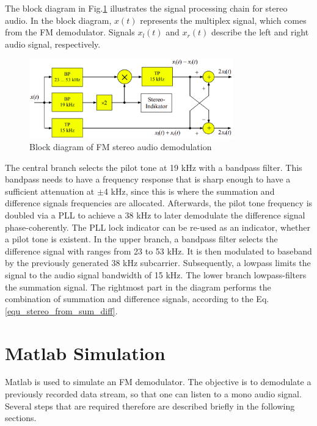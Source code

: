 \documentclass[conference]{IEEEtran}
\begin{document}
    The block diagram in Fig.\ref{fig_bd_stereo_demod} illustrates the signal processing chain for stereo audio. In the block diagram, $x(t)$ represents the multiplex signal, which comes from the FM demodulator. Signals $x_l(t)$ and $x_r(t)$ describe the left and right audio signal, respectively.

    \begin{figure}[!h]
      \centering
        \includegraphics[width=8.8cm]{img/fm-demod-stereo-audio.png}
      \caption{Block diagram of FM stereo audio demodulation \cite{ref_roppel}}
      \label{fig_bd_stereo_demod}
    \end{figure}

    The central branch selects the pilot tone at 19 kHz with a bandpass filter.
    This bandpass needs to have a frequency response that is sharp enough to have a sufficient attenuation at $\pm$4 kHz, since this is where the summation and difference signals frequencies are allocated.
    Afterwards, the pilot tone frequency is doubled via a PLL to achieve a 38 kHz to later demodulate the difference signal phase-coherently.
    The PLL lock indicator can be re-used as an indicator, whether a pilot tone is existent.
    In the upper branch, a bandpass filter selects the difference signal with ranges from 23 to 53 kHz.
    It is then modulated to baseband by the previously generated 38 kHz subcarrier.
    Subsequently, a lowpass limits the signal to the audio signal bandwidth of 15 kHz.
    The lower branch lowpass-filters the summation signal.
    The rightmost part in the diagram performs the combination of summation and difference signals, according to the Eq.\ref{equ_stereo_from_sum_diff}.

\section{Matlab Simulation}
  Matlab is used to simulate an FM demodulator.
  The objective is to demodulate a previously recorded data stream, so that one can listen to a mono audio signal.
  Several steps that are required therefore are described briefly in the following sections.
\end{document}
